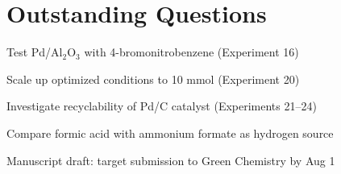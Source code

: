 \documentclass[
    language=english,
    doctype=experiment-log,
    institution=none,
]{../../omnilatex}
\begin{document}
\section{Outstanding Questions}
\label{sec:questions}

\begin{todo}
    \item Test Pd/Al$_2$O$_3$ with 4-bromonitrobenzene (Experiment 16)
    \item Scale up optimized conditions to 10 mmol (Experiment 20)
    \item Investigate recyclability of Pd/C catalyst (Experiments 21--24)
    \item Compare formic acid with ammonium formate as hydrogen source
    \item Manuscript draft: target submission to Green Chemistry by Aug 1
\end{todo}



\end{document}
